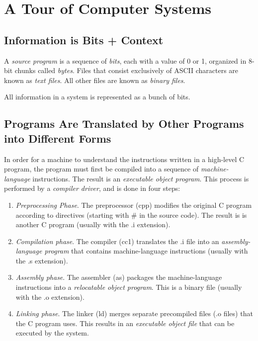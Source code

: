 \chapter{A Tour of Computer Systems}

\section{Information is Bits + Context}

A \textit{source program} is a sequence of \textit{bits}, each with a value of 0 or 1, organized in 8-bit chunks called \textit{bytes}.
Files that consist exclusively of ASCII characters are known as \textit{text files}. All other files are known as \textit{binary files}.

All information in a system is represented as a bunch of bits.

\section{Programs Are Translated by Other Programs into Different Forms}

In order for a machine to understand the instructions written in a high-level C program,
the program must first be compiled into a sequence of \textit{machine-language} instructions. The result is an \textit{executable object program}.
This process is performed by a \textit{compiler driver}, and is done in four steps:

\begin{enumerate}
    \item
      \textit{Preprocessing Phase}. The preprocessor (cpp) modifies the
      original C program according to directives (starting with \# in the
      source code). The result is is another C program (usually with the .i
      extension).

    \item
      \textit{Compilation phase}. The compiler (cc1) translates the .i file
      into an \textit{assembly-language program} that contains machine-language
      instructions (usually with the .s extension).

    \item
      \textit{Assembly phase}. The assembler (as) packages the machine-language
      instructions into a \textit{relocatable object program}. This is a binary
      file (usually with the .o extension).

    \item
      \textit{Linking phase}. The linker (ld) merges separate precompiled files
      (.o files) that the C program uses. This results in an \textit{executable
      object file} that can be executed by the system.

\end{enumerate}

